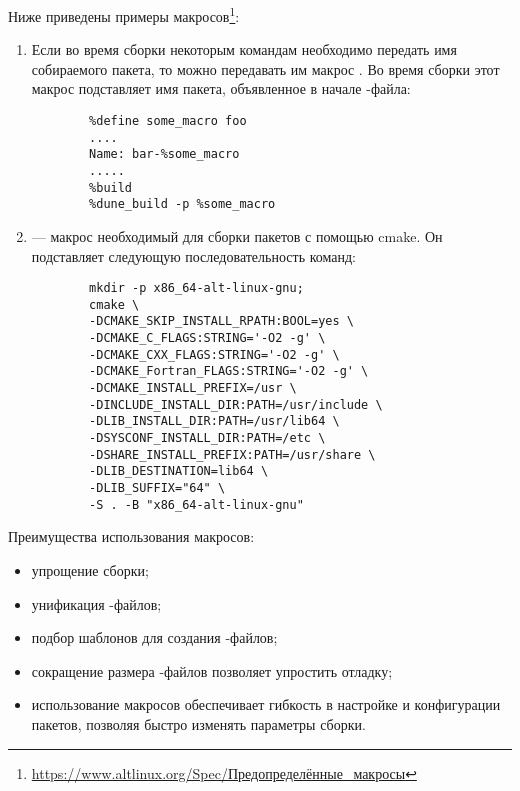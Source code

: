 Ниже приведены примеры макросов\footnote{\href{https://www.altlinux.org/Spec/\%D0\%9F\%D1\%80\%D0\%B5\%D0\%B4\%D0\%BE\%D0\%BF\%D1\%80\%D0\%B5\%D0\%B4\%D0\%B5\%D0\%BB\%D0\%B5\%D0\%BD\%D0\%BD\%D1\%8B\%D0\%B5_\%D0\%BC\%D0\%B0\%D0\%BA\%D1\%80\%D0\%BE\%D1\%81\%D1\%8B}{https://www.altlinux.org/Spec/Предопределённые\_макросы}}:
\begin{enumerate}
	\item {}
	Если во время сборки некоторым командам необходимо передать имя собираемого пакета, 
		то можно передавать им макрос . Во время сборки этот макрос подставляет 
		имя пакета, объявленное в начале -файла:
	\begin{verbatim}
		%define some_macro foo
		....
		Name: bar-%some_macro
		.....
		%build
		%dune_build -p %some_macro
	\end{verbatim} 
	
	\item {}
	 --- макрос необходимый для сборки пакетов с помощью cmake. 
		Он подставляет следующую последовательность команд: 
	\begin{verbatim}
		mkdir -p x86_64-alt-linux-gnu; 
		cmake \
		-DCMAKE_SKIP_INSTALL_RPATH:BOOL=yes \
		-DCMAKE_C_FLAGS:STRING='-O2 -g' \
		-DCMAKE_CXX_FLAGS:STRING='-O2 -g' \
		-DCMAKE_Fortran_FLAGS:STRING='-O2 -g' \
		-DCMAKE_INSTALL_PREFIX=/usr \
		-DINCLUDE_INSTALL_DIR:PATH=/usr/include \
		-DLIB_INSTALL_DIR:PATH=/usr/lib64 \
		-DSYSCONF_INSTALL_DIR:PATH=/etc \
		-DSHARE_INSTALL_PREFIX:PATH=/usr/share \
		-DLIB_DESTINATION=lib64 \
		-DLIB_SUFFIX="64" \
		-S . -B "x86_64-alt-linux-gnu"
	\end{verbatim}
\end{enumerate}

Преимущества использования макросов:
\begin{itemize}
	\item упрощение сборки;
	\item унификация -файлов;
	\item подбор шаблонов для создания \Sys{SPEC}-файлов;
	\item сокращение размера \Sys{SPEC}-файлов позволяет упростить отладку;
	\item использование макросов обеспечивает гибкость в настройке и конфигурации 
		пакетов, позволяя быстро изменять параметры сборки.
\end{itemize}

